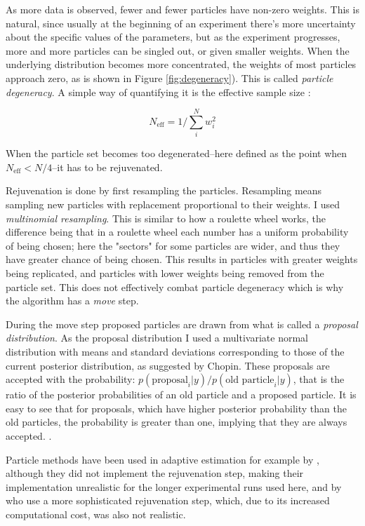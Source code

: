 \documentclass{article}\usepackage{knitr}
\begin{document}
As more data is observed, fewer and fewer particles have non-zero weights. This is natural, since usually at the beginning of an experiment there's more uncertainty about the specific values of the parameters, but as the experiment progresses, more and more particles can be singled out, or given smaller weights. When the underlying distribution becomes more concentrated, the weights of most particles approach zero, as is shown in Figure \ref{fig:degeneracy}). This is called \textit{particle degeneracy}. A simple way of quantifying it is the effective sample size \citep{speekenbrink2016}:

\begin{equation}
N_{\text{eff}} = 1 / \sum_{i}^{N} w_i^2
\end{equation}

When the particle set becomes too degenerated--here defined as the point when $N_{\text{eff}} < N/4$--it has to be rejuvenated. 

Rejuvenation is done by first resampling the particles. Resampling means sampling new particles with replacement proportional to their weights. I used \textit{multinomial resampling}. This is similar to how a roulette wheel works, the difference being that in a roulette wheel each number has a uniform probability of being chosen; here the "sectors" for some particles are wider, and thus they have greater chance of being chosen. This results in particles with greater weights being replicated, and particles with lower weights being removed from the particle set. This does not effectively combat particle degeneracy which is why the algorithm has a \textit{move} step. \citep{chopin2002}

During the move step proposed particles are drawn from what is called a \textit{proposal distribution}. As the proposal distribution I used a multivariate normal distribution with means and standard deviations corresponding to those of the current posterior distribution, as suggested by Chopin. These proposals are accepted with the probability: $p(\text{proposal}_i | y) / p(\text{old particle}_i | y)$, that is the ratio of the posterior probabilities of an old particle and a proposed particle. It is easy to see that for proposals, which have higher posterior probability than the old particles, the probability is greater than one, implying that they are always accepted. \citep{chopin2002}. 

Particle methods have been used in adaptive estimation for example by \citet{dimattina2015}, although they did not implement the rejuvenation step, making their implementation unrealistic for the longer experimental runs used here, and by  \citet{kujalalukka2006} who use a more sophisticated  rejuvenation step, which, due to its increased computational cost, was also not realistic. 
\end{document}
